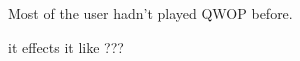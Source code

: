 \documentclass[12pt,a4paper,twoside,openright]{report}
\begin{document}
Most of the user hadn't played QWOP before.

it effects it like ???


\end{document}
